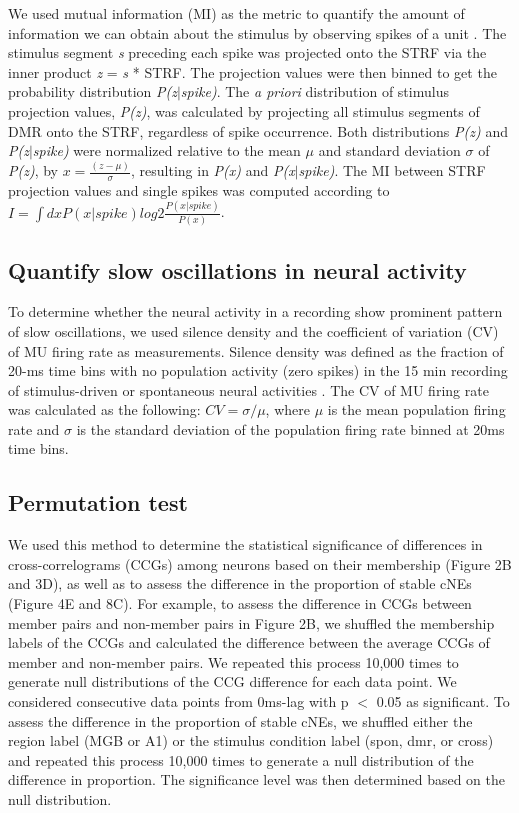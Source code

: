 \documentclass[11pt]{article}
\begin{document}
We used mutual information (MI) as the metric to quantify the amount of information we can obtain about the stimulus by observing spikes of a unit \citep{Atencio2008, See2018}. The stimulus segment \emph{s} preceding each spike was projected onto the STRF via the inner product \emph{z} = \emph{s} * STRF. The projection values were then binned to get the probability distribution \emph{P(z$|$spike)}. The \emph{a priori} distribution of stimulus projection values, \emph{P(z)}, was calculated by projecting all stimulus segments of DMR onto the STRF, regardless of spike occurrence. Both distributions \emph{P(z)} and \emph{P(z$|$spike)} were normalized relative to the mean $\mu$ and standard deviation $\sigma$ of \emph{P(z)}, by \emph{$x = \frac{(z - \mu)}{\sigma}$}, resulting in \emph{P(x)} and \emph{P(x$|$spike)}. The MI between STRF projection values and single spikes was computed according to $I = \int dxP(x|spike)log2\frac{P(x|spike)}{P(x)}$. 

\subsection*{Quantify slow oscillations in neural activity}
To determine whether the neural activity in a recording show prominent pattern of slow oscillations, we used silence density and the coefficient of variation (CV) of MU firing rate as measurements. Silence density was defined as the fraction of 20-ms time bins with no population activity (zero spikes) in the 15 min recording of stimulus-driven or spontaneous neural activities \citep{Mochol2015}. The CV of MU firing rate was calculated as the following: $CV = \sigma / \mu $, where $\mu$ is the mean population firing rate and $\sigma$ is the standard deviation of the population firing rate binned at 20ms time bins. 

\subsection*{Permutation test}
We used this method to determine the statistical significance of differences in cross-correlograms (CCGs) among neurons based on their membership (Figure 2B and 3D), as well as to assess the difference in the proportion of stable cNEs (Figure 4E and 8C). For example, to assess the difference in CCGs between member pairs and non-member pairs in Figure 2B, we shuffled the membership labels of the CCGs and calculated the difference between the average CCGs of member and non-member pairs. We repeated this process 10,000 times to generate null distributions of the CCG difference for each data point. We considered consecutive data points from 0ms-lag with p $<$ 0.05 as significant. To assess the difference in the proportion of stable cNEs, we shuffled either the region label (MGB or A1) or the stimulus condition label (spon, dmr, or cross) and repeated this process 10,000 times to generate a null distribution of the difference in proportion. The significance level was then determined based on the null distribution.
\end{document}
